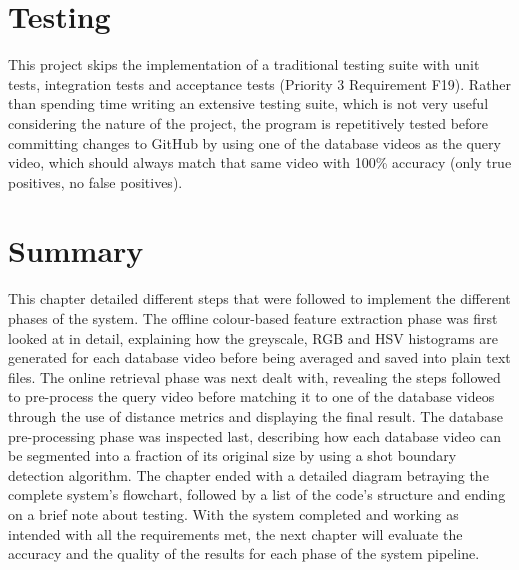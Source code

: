 
\section{Testing}

This project skips the implementation of a traditional testing suite with unit tests, integration tests and acceptance tests (Priority 3 Requirement F19). Rather than spending time writing an extensive testing suite, which is not very useful considering the nature of the project, the program is repetitively tested before committing changes to GitHub by using one of the database videos as the query video, which should always match that same video with 100\% accuracy (only true positives, no false positives).


\section{Summary}

This chapter detailed different steps that were followed to implement the different phases of the system. The offline colour-based feature extraction phase was first looked at in detail, explaining how the greyscale, RGB and HSV histograms are generated for each database video before being averaged and saved into plain text files. The online retrieval phase was next dealt with, revealing the steps followed to pre-process the query video before matching it to one of the database videos through the use of distance metrics and displaying the final result. The database pre-processing phase was inspected last, describing how each database video can be segmented into a fraction of its original size by using a shot boundary detection algorithm. The chapter ended with a detailed diagram betraying the complete system's flowchart, followed by a list of the code's structure and ending on a brief note about testing. With the system completed and working as intended with all the requirements met, the next chapter will evaluate the accuracy and the quality of the results for each phase of the system pipeline. 